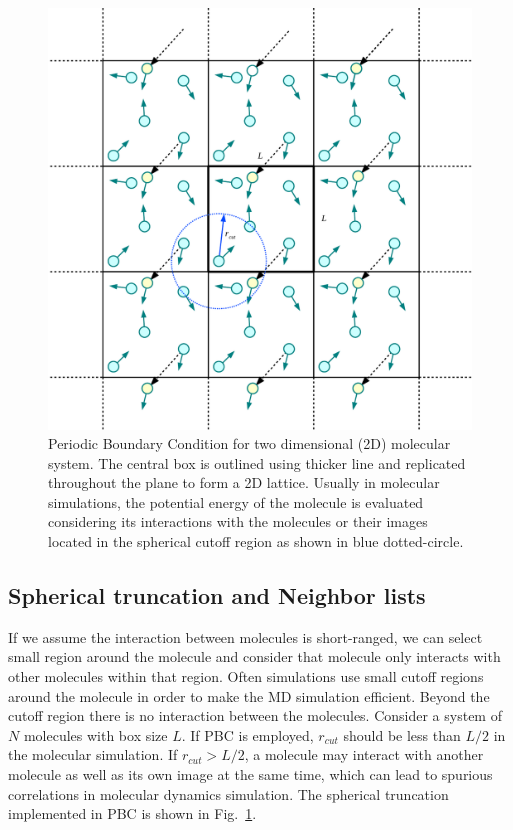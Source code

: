   
\begin{figure}[tpb]
  \begin{center}
    \centerline{\includegraphics[width = \linewidth]{PBC.pdf}}
    \caption{Periodic Boundary Condition for two dimensional (2D) molecular system. The central 	box is outlined using thicker line and replicated throughout the plane to form a 2D lattice. Usually in molecular simulations, the potential energy of the molecule is evaluated considering its interactions with the molecules or their images located in the spherical cutoff region as shown in blue dotted-circle.}
    \label{fig:PBC}
  \end{center}
\end{figure}

\subsection{Spherical truncation and Neighbor lists }
If we assume the interaction between molecules is short-ranged, we can select small region around the molecule and consider that molecule only interacts with other molecules within that region. Often simulations use small cutoff regions around the molecule in order to make the MD simulation efficient. Beyond the cutoff region there is no interaction between the molecules. Consider a system of $N$  molecules with box size $L$. If PBC is employed, $r_{cut}$ should be less than $L/2$ in the molecular  simulation. If $r_{cut} > L/2$, a molecule may interact with another molecule as well as its own image at the same time, which can lead to spurious correlations in molecular dynamics simulation. The spherical truncation implemented in PBC is shown in Fig.~\ref{fig:PBC}. 

